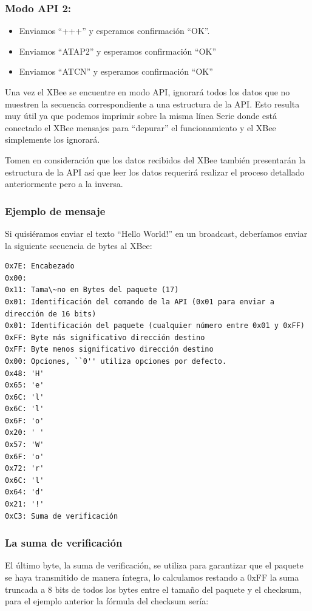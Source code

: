 \documentclass[11pt,oneside,spanish,a4paper]{article}
\begin{document}
\subsubsection{Modo API 2:}
\begin{itemize}
	\item Enviamos ``+++'' y esperamos confirmaci\'on ``OK''.
	\item Enviamos ``ATAP2'' y esperamos confirmaci\'on ``OK''
	\item Enviamos ``ATCN'' y esperamos confirmaci\'on ``OK''
\end{itemize}
Una vez el XBee se encuentre en modo API, ignorará todos los datos que no muestren la secuencia correspondiente a una estructura de la API. Esto resulta muy útil ya que podemos imprimir sobre la misma línea Serie donde está conectado el XBee mensajes para ``depurar'' el funcionamiento y el XBee simplemente los ignorará.

Tomen en consideración que los datos recibidos del XBee también presentarán la estructura de la API así que leer los datos requerirá realizar el proceso detallado anteriormente pero a la inversa.

\subsubsection{Ejemplo de mensaje}
Si quisiéramos enviar el texto ``Hello World!'' en un broadcast, deberíamos enviar la siguiente secuencia de bytes al XBee:
\begin{lstlisting}[emph={0x7E:,0x00:,0x11:,0x01:,0xFF:,0xFF:,0x00:,
0x48:,0x65:,0x6C:,0x6C:,0x6F:,0x20:,0x57:,0x6F:,0x72:,0x6C:,0x64:,0x21:,
0xC3}, emphstyle={\color{blue}}, label=code:apiEjempl-id]
0x7E: Encabezado
0x00:
0x11: Tama\~no en Bytes del paquete (17)
0x01: Identificación del comando de la API (0x01 para enviar a dirección de 16 bits)
0x01: Identificación del paquete (cualquier número entre 0x01 y 0xFF)
0xFF: Byte más significativo dirección destino
0xFF: Byte menos significativo dirección destino
0x00: Opciones, ``0'' utiliza opciones por defecto.
0x48: 'H'
0x65: 'e'
0x6C: 'l'
0x6C: 'l'
0x6F: 'o'
0x20: ' '
0x57: 'W'
0x6F: 'o'
0x72: 'r'
0x6C: 'l'
0x64: 'd'
0x21: '!'
0xC3: Suma de verificación
\end{lstlisting}  
\subsubsection{La suma de verificación}
El último byte, la suma de verificación, se utiliza para garantizar que el paquete se haya transmitido de manera íntegra, lo calculamos restando a 0xFF la suma truncada a 8 bits de todos los bytes entre el tamaño del paquete y el checksum, para el ejemplo anterior la fórmula del checksum sería:
\end{document}

